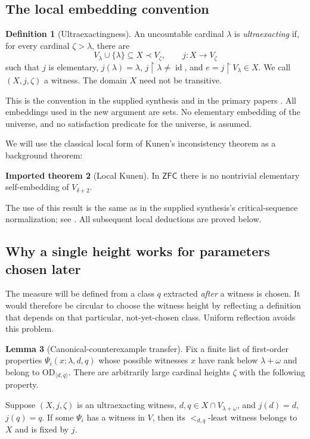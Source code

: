 \documentclass[11pt,letterpaper]{article}
\theoremstyle{definition}
\newtheorem{definition}{Definition}[section]
\newtheorem{lemma}[definition]{Lemma}
\newtheorem{inputthm}[definition]{Imported theorem}
\newcommand{\ZFC}{\mathsf{ZFC}}
\newcommand{\OD}{\mathrm{OD}}
\newcommand{\id}{\operatorname{id}}
\newcommand{\restr}{\mathbin{\upharpoonright}}
\newcommand{\ODpar}[2]{\OD_{\langle #1,#2\rangle}}
\begin{document}
\subsection{The local embedding convention}

\begin{definition}[Ultraexactingness]\label{def:uex}
An uncountable cardinal $\lambda$ is \emph{ultraexacting} if, for every cardinal $\zeta>\lambda$, there are
\[
 V_\lambda\cup\{\lambda\}\subseteq X\prec V_\zeta,
 \qquad j:X\longrightarrow V_\zeta
\]
such that $j$ is elementary, $j(\lambda)=\lambda$, $j\restr\lambda\ne\id$, and $e=j\restr V_\lambda\in X$. We call $(X,j,\zeta)$ a witness. The domain $X$ need not be transitive.
\end{definition}

This is the convention in the supplied synthesis and in the primary papers \cite{abl,abgl}. All embeddings used in the new argument are sets. No elementary embedding of the universe, and no satisfaction predicate for the universe, is assumed.

We will use the classical local form of Kunen's inconsistency theorem as a background theorem:
\begin{inputthm}[Local Kunen]\label{input:kunen}
In $\ZFC$ there is no nontrivial elementary self-embedding of $V_{\delta+2}$.
\end{inputthm}
The use of this result is the same as in the supplied synthesis's critical-sequence normalization; see \cite{kunen,hkp}. All subsequent local deductions are proved below.

\subsection{Why a single height works for parameters chosen later}

The measure will be defined from a class $q$ extracted \emph{after} a witness is chosen. It would therefore be circular to choose the witness height by reflecting a definition that depends on that particular, not-yet-chosen class. Uniform reflection avoids this problem.

\begin{lemma}[Canonical-counterexample transfer]\label{lem:canonical}
Fix a finite list of first-order properties $\Psi_i(x;\lambda,d,q)$ whose possible witnesses $x$ have rank below $\lambda+\omega$ and belong to $\ODpar dq$. There are arbitrarily large cardinal heights $\zeta$ with the following property.

Suppose $(X,j,\zeta)$ is an ultraexacting witness, $d,q\in X\cap V_{\lambda+\omega}$, and $j(d)=d$, $j(q)=q$. If some $\Psi_i$ has a witness in $V$, then its $<_{d,q}$-least witness belongs to $X$ and is fixed by $j$.
\end{lemma}
\end{document}
